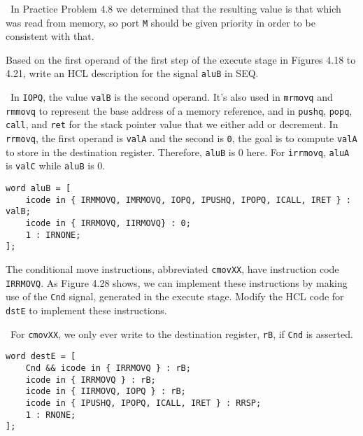 \documentclass[12pt]{article}
\newenvironment{ex}[2][Exercise]{\begin{trivlist}
		\item[\hskip \labelsep {\bfseries #1}\hskip \labelsep {\bfseries #2.}]}{\end{trivlist}}
\newenvironment{sol}[1][Solution]{\begin{trivlist}
		\item[\hskip \labelsep {\bfseries #1:}]}{\end{trivlist}}
\begin{document}
\begin{sol}
	\
	In Practice Problem 4.8 we determined that the resulting value is that which
	was read from memory, so port \texttt{M} should be given priority in order
	to be consistent with that.
\end{sol}

\begin{ex}{4.23}
	Based on the first operand of the first step of the execute stage in Figures
	4.18 to 4.21, write an HCL description for the signal \texttt{aluB} in
	SEQ.
\end{ex}

\begin{sol}
	\
	In \texttt{IOPQ}, the value \texttt{valB} is the second operand. It's
	also used in \texttt{mrmovq} and \texttt{rmmovq} to represent the base address of a memory reference, and in \texttt{pushq}, \texttt{popq}, \texttt{call},
	and \texttt{ret} for the stack pointer value that we either add or decrement.
	In \texttt{rrmovq}, the first operand is \texttt{valA} and the second is
	\texttt{0}, the goal is to compute \texttt{valA} to store in the destination
	register. Therefore, \texttt{aluB} is 0 here. For \texttt{irrmovq}, \texttt{aluA}
	is \texttt{valC} while \texttt{aluB} is 0.
	\begin{lstlisting}[language={}]
word aluB = [
	icode in { IRMMOVQ, IMRMOVQ, IOPQ, IPUSHQ, IPOPQ, ICALL, IRET } : valB;
	icode in { IRRMOVQ, IIRMOVQ} : 0;
	1 : IRNONE;
];
	\end{lstlisting}
\end{sol}

\begin{ex}{4.24}
	The conditional move instructions, abbreviated \texttt{cmovXX}, have
	instruction code \texttt{IRRMOVQ}. As Figure 4.28 shows, we can implement
	these instructions by making use of the \texttt{Cnd} signal, generated in
	the execute stage. Modify the HCL code for \texttt{dstE} to implement these
	instructions.
\end{ex}

\begin{sol}
	\
	For \texttt{cmovXX}, we only ever write to the destination register,
	\texttt{rB}, if \texttt{Cnd} is asserted. 
	\begin{lstlisting}[language={}]
word destE = [
	Cnd && icode in { IRRMOVQ } : rB;
	icode in { IRRMOVQ } : rB;
	icode in { IIRMOVQ, IOPQ } : rB;
	icode in { IPUSHQ, IPOPQ, ICALL, IRET } : RRSP;
	1 : RNONE;
];
	\end{lstlisting}
\end{sol}
\end{document}
